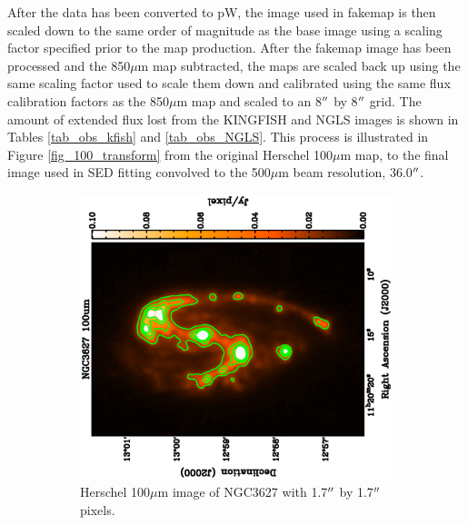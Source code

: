 After the data has been converted to pW, the image used in fakemap is then scaled down to the same order of magnitude as the base image using a scaling factor specified prior to the map production.  After the fakemap image has been processed and the 850$\mu$m map subtracted, the maps are scaled back up using the same scaling factor used to scale them down and calibrated using the same flux calibration factors as the 850$\mu$m map and scaled to an 8$\mbox{$^{\prime\prime}$}$ by 8$\mbox{$^{\prime\prime}$}$ grid.  The amount of extended flux lost from the KINGFISH and NGLS images is shown in Tables \ref{tab_obs_kfish} and \ref{tab_obs_NGLS}.  This process is illustrated in Figure \ref{fig_100_transform} from the original Herschel 100$\mu$m map, to the final image used in SED fitting convolved to the 500$\mu$m beam resolution, 36.0$\mbox{$^{\prime\prime}$}$.

\begin{figure}
  \centering
  \begin{subfigure}[t]{.48\textwidth}
    \centering
    \includegraphics[width=1.\linewidth, angle=270]{obs_imgs/100_orig.eps}
    \caption{Herschel 100$\mu$m image of NGC3627 with 1.7$\mbox{$^{\prime\prime}$}$ by 1.7$\mbox{$^{\prime\prime}$}$ pixels.}
  \end{subfigure}%
  \quad
  \begin{subfigure}[t]{.48\textwidth}
    \centering

\end{subfigure}
\end{figure}
